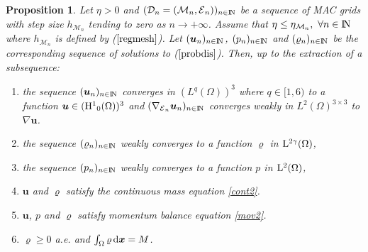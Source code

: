 \documentclass{amsart}
\newtheorem{prop}{Proposition}
\numberwithin{equation}{section}
\begin{document}
\begin{prop}
Let $\eta >0$ and $({{\mathcal D}}_n= ({{\mathcal M}}_n,\operatorname{{\mathcal{E}}}_n))_{{n \in {\ifmmode{\rm	I\mkern-3.1mu
N\mkern0.5mu}\else{\rm I\kern-.16em
N\hskip0.5pt\ }\fi\relax}}}$ be a sequence of  MAC grids  with step size $h_{{{\mathcal M}}_n}$ tending to zero as ${{n {\rightarrow} + \infty}}$. Assume that $ \eta \le \eta_{{{\mathcal M}}_n}, \ \forall {{n \in {\ifmmode{\rm	I\mkern-3.1mu
N\mkern0.5mu}\else{\rm I\kern-.16em
N\hskip0.5pt\ }\fi\relax}}}$ where $h_{{{\mathcal M}}_n}$ is defined by ($\ref{regmesh}$).
Let $({{\boldsymbol u}}_n)_{{n \in {\ifmmode{\rm	I\mkern-3.1mu
N\mkern0.5mu}\else{\rm I\kern-.16em
N\hskip0.5pt\ }\fi\relax}}}$, $(p_n)_{{n \in {\ifmmode{\rm	I\mkern-3.1mu
N\mkern0.5mu}\else{\rm I\kern-.16em
N\hskip0.5pt\ }\fi\relax}}}$ and $({\varrho}_n)_{{n \in {\ifmmode{\rm	I\mkern-3.1mu
N\mkern0.5mu}\else{\rm I\kern-.16em
N\hskip0.5pt\ }\fi\relax}}}$  be the corresponding sequence of solutions to ($\ref{probdis}$).
Then, up to the extraction of a subsequence:
\begin{enumerate}
\item the sequence $({{\boldsymbol u}}_n)_{{n \in {\ifmmode{\rm	I\mkern-3.1mu
N\mkern0.5mu}\else{\rm I\kern-.16em
N\hskip0.5pt\ }\fi\relax}}}$  converges in $(L^q(\Omega))^3$ where $ q \in [1,6) $ to a function ${{\boldsymbol u}}\in({{\rm H}^{1}}_0(\Omega))^3$ and $( \nabla_{\operatorname{{\mathcal{E}}}_n} {{\boldsymbol u}}_n)_{{n \in {\ifmmode{\rm	I\mkern-3.1mu
N\mkern0.5mu}\else{\rm I\kern-.16em
N\hskip0.5pt\ }\fi\relax}}} $ converges weakly in $L^2(\Omega)^{3 \times 3} $ to $\nabla {{\boldsymbol u}}$.
\item the sequence $({\varrho}_n)_{{n \in {\ifmmode{\rm	I\mkern-3.1mu
N\mkern0.5mu}\else{\rm I\kern-.16em
N\hskip0.5pt\ }\fi\relax}}}$ weakly converges to a function ${\varrho}$ in ${{\rm L}}^{2\gamma}(\Omega)$,
\item the sequence $(p_n)_{{n \in {\ifmmode{\rm	I\mkern-3.1mu
N\mkern0.5mu}\else{\rm I\kern-.16em
N\hskip0.5pt\ }\fi\relax}}}$ weakly converges to a function $p$ in ${{\rm L}^{2}}(\Omega)$,
\item ${{\boldsymbol u}}$ and ${\varrho}$  satisfy the continuous mass  equation \eqref{cont2}.
\item ${{\boldsymbol u}}$, $p$ and ${\varrho}$ satisfy momentum balance equation \eqref{mov2}.
\item ${\varrho} \ge 0$ a.e. and $\int_\Omega {\varrho} {\, {\rm d}{{\boldsymbol x}}} = M$.
\end{enumerate}
\label{prop:conv1}\end{prop}
\end{document}
